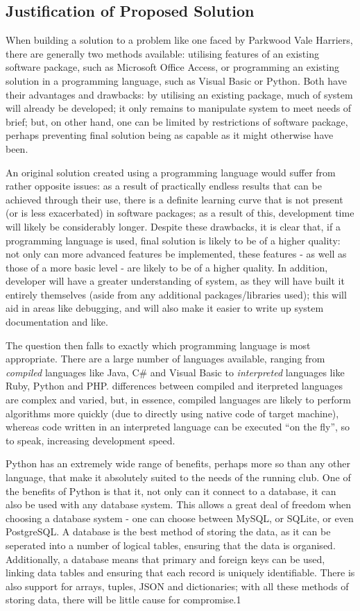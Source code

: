 \documentclass{article}[12pt,a4paper]
\begin{document}
\subsection{Justification of Proposed Solution}
When building a solution to a problem like one faced by Parkwood Vale Harriers, there are generally two methods available: utilising features of an existing software package, such as Microsoft Office Access, or programming an existing solution in a programming language, such as Visual Basic or Python. Both have their advantages and drawbacks: by utilising an existing package, much of system will already be developed; it only remains to manipulate system to meet needs of brief; but, on other hand, one can be limited by restrictions of software package, perhaps preventing final solution being as capable as it might otherwise have been.

An original solution created using a programming language would suffer from rather opposite issues: as a result of practically endless results that can be achieved through their use, there is a definite learning curve that is not present (or is less exacerbated) in software packages; as a result of this, development time will likely be considerably longer. Despite these drawbacks, it is clear that, if a programming language is used, final solution is likely to be of a higher quality: not only can more advanced features be implemented, these features - as well as those of a more basic level - are likely to be of a higher quality.  In addition, developer will have a greater understanding of system, as they will have built it entirely themselves (aside from any additional packages/libraries used); this will aid in areas like debugging, and will also make it easier to write up system documentation and like.

The question then falls to exactly which programming language is most appropriate. There are a large number of languages available, ranging from \textit{compiled} languages like Java, C\# and Visual Basic to \textit{interpreted} languages like Ruby, Python and PHP. differences between compiled and iterpreted languages are complex and varied, but, in essence, compiled languages are likely to perform algorithms more quickly (due to directly using native code of target machine), whereas code written in an interpreted language can be executed ``on the fly'', so to speak, increasing development speed. 

Python has an extremely wide range of benefits, perhaps more so than any other language, that make it absolutely suited to the needs of the running club. One of the benefits of Python is that it, not only can it connect to a database, it can also be used with any database system. This allows a great deal of freedom when choosing a database system - one can choose between MySQL, or SQLite, or even PostgreSQL. A database is the best method of storing the data, as it can be seperated into a number of logical tables, ensuring that the data is organised. Additionally, a database means that primary and foreign keys can be used, linking data tables and ensuring that each record is uniquely identifiable. There is also support for arrays, tuples, JSON and dictionaries; with all these methods of storing data, there will be little cause for compromise.1
\end{document}
